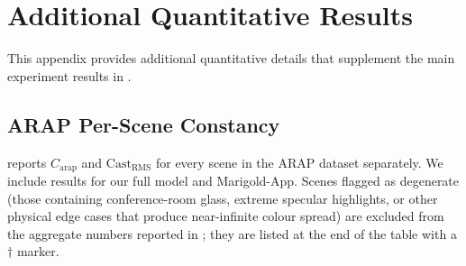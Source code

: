 \chapter{Additional Quantitative Results}
\label{ch:appendix}

This appendix provides additional quantitative details that supplement the main
experiment results in .


\section{ARAP Per-Scene Constancy}

 reports $C_{\text{arap}}$ and $\text{Cast}_{\text{RMS}}$
for every scene in the ARAP dataset separately.
We include results for our full model and Marigold-App.
Scenes flagged as degenerate (those containing conference-room glass, extreme
specular highlights, or other physical edge cases that produce near-infinite colour
spread) are excluded from the aggregate numbers reported in ;
they are listed at the end of the table with a $\dagger$ marker.

